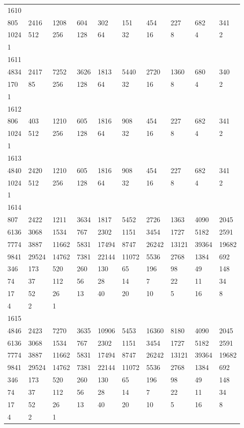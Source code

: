 \begin{longtable}{*{10}{l}}
1610&&&&&&&&&\\
805& 2416& 1208& 604& 302& 151& 454& 227& 682& 341\\
1024& 512& 256& 128& 64& 32& 16& 8& 4& 2\\
1& \\

1611&&&&&&&&&\\
4834& 2417& 7252& 3626& 1813& 5440& 2720& 1360& 680& 340\\
170& 85& 256& 128& 64& 32& 16& 8& 4& 2\\
1& \\

1612&&&&&&&&&\\
806& 403& 1210& 605& 1816& 908& 454& 227& 682& 341\\
1024& 512& 256& 128& 64& 32& 16& 8& 4& 2\\
1& \\

1613&&&&&&&&&\\
4840& 2420& 1210& 605& 1816& 908& 454& 227& 682& 341\\
1024& 512& 256& 128& 64& 32& 16& 8& 4& 2\\
1& \\

1614&&&&&&&&&\\
807& 2422& 1211& 3634& 1817& 5452& 2726& 1363& 4090& 2045\\
6136& 3068& 1534& 767& 2302& 1151& 3454& 1727& 5182& 2591\\
7774& 3887& 11662& 5831& 17494& 8747& 26242& 13121& 39364& 19682\\
9841& 29524& 14762& 7381& 22144& 11072& 5536& 2768& 1384& 692\\
346& 173& 520& 260& 130& 65& 196& 98& 49& 148\\
74& 37& 112& 56& 28& 14& 7& 22& 11& 34\\
17& 52& 26& 13& 40& 20& 10& 5& 16& 8\\
4& 2& 1& \\

1615&&&&&&&&&\\
4846& 2423& 7270& 3635& 10906& 5453& 16360& 8180& 4090& 2045\\
6136& 3068& 1534& 767& 2302& 1151& 3454& 1727& 5182& 2591\\
7774& 3887& 11662& 5831& 17494& 8747& 26242& 13121& 39364& 19682\\
9841& 29524& 14762& 7381& 22144& 11072& 5536& 2768& 1384& 692\\
346& 173& 520& 260& 130& 65& 196& 98& 49& 148\\
74& 37& 112& 56& 28& 14& 7& 22& 11& 34\\
17& 52& 26& 13& 40& 20& 10& 5& 16& 8\\
4& 2& 1& \\


\end{longtable}
